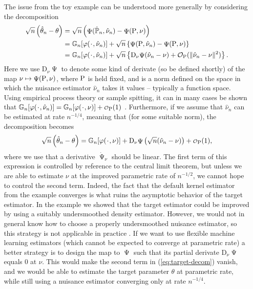 \documentclass[a4,danish]{article}
\DeclareMathOperator{\TT}{\Psi}
\begin{document}
  The issue from the toy example can be understood more generally by
  considering the decomposition
\begin{align*}
  \sqrt{n}
  \left(
  \hat{\theta}_n - \theta
  \right)
  & =  \sqrt{n}
    \left(
    \TT(\empmeas,\hat{\nu}_n) - \TT(\P,\nu)
    \right) \\
  & =
    \G{\phi( \blank, \hat{\nu}_n)}
    + \sqrt{n}
    \left\{
    \TT(\P,\hat{\nu}_n) - \TT(\P,\nu)
    \right\}
  \\
  & = \G{\phi( \blank, \hat{\nu}_n)}
    + \sqrt{n}
    \left\{
    \mathrm{D}_{\nu}{\TT}(\hat{\nu}_n - \nu)
    + \mathcal{O}_{\P}(\Vert \hat{\nu}_n - \nu \Vert^2)
    \right\}.
\end{align*}
Here we use $\mathrm{D}_{\nu}{\TT}$ to denote some kind of derivate
(so be defined shortly) of the map $\nu \mapsto \TT(\P, \nu)$, where
$\P$ is held fixed, and  is a norm defined on the
space in which the nuisance estimator $\hat{\nu}_n$ takes it values --
typically a function space. Using empirical process theory or sample
spitting, it can in many cases be shown that $\G{\phi( \blank, \hat{\nu}_n)} = \G{\phi( \blank, \nu)} +
\smallO_{\P}(1)$
\citep{van1996weak,van2000asymptotic,chernozhukov2018double}. Furthermore,
if we assume that $\hat{\nu}_n$ can be estimated at rate $n^{-1/4}$,
meaning that 
(for some suitable norm), the decomposition becomes
\begin{equation}
  \label{eq:target-decom}
  \sqrt{n}
  \left(
    \hat{\theta}_n - \theta
  \right)
  = \G{\phi( \blank, \nu)}
  + \mathrm{D}_{\nu}{\TT}
  \left(
    \sqrt{n}(\hat{\nu}_n - \nu)
  \right)
  + \smallO_{\P}(1),
\end{equation}
where we use that a derivative $\dot{\TT}_{\nu}$ should be linear. The
first term of this expression is controlled by reference to the
central limit theorem, but unless we are able to estimate $\nu$ at the
improved parametric rate of $n^{-1/2}$, we cannot hope to control the
second term. Indeed, the fact that the default kernel estimator from
the example converges  is what
ruins the asymptotic behavior of the target estimator.  In the example
we showed that the target estimator could be improved by using a
suitably undersmoothed density estimator. However, we would not in
general know how to choose a properly undersmoothed nuisance
estimator, so this strategy is not applicable in practice . If we want to use flexible
machine learning estimators (which cannot be expected to converge at
parametric rate) a better strategy is to design the map to $\TT$ such
that its partial derivate $\mathrm{D}_{\nu}{\TT}$ equals 0 at
$\nu$. This would make the second term in (\ref{eq:target-decom})
vanish, and we would be able to estimate the target parameter $\theta$
at parametric rate, while still using a nuisance estimator converging
only at rate $n^{-1/4}$.
\end{document}
